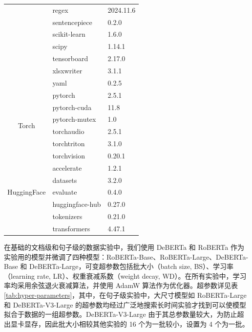 \begin{table}[htbp]
\begin{tabular}{cll}
                             & regex             & 2024.11.6    \\
                             & sentencepiece     & 0.2.0        \\
                             & scikit-learn      & 1.6.0        \\
                             & scipy             & 1.14.1       \\
                             & tensorboard       & 2.17.0       \\
                             & xlsxwriter        & 3.1.1        \\
                             & yaml              & 0.2.5        \\ \midrule
\multirow{6}{*}{Torch}       & pytorch           & 2.5.1        \\
                             & pytorch-cuda      & 11.8         \\
                             & pytorch-mutex     & 1.0          \\
                             & torchaudio        & 2.5.1        \\
                             & torchtriton       & 3.1.0        \\
                             & torchvision       & 0.20.1       \\ \midrule
\multirow{5}{*}{HuggingFace} & accelerate        & 1.2.1        \\
                             & datasets          & 3.2.0        \\
                             & evaluate          & 0.4.0        \\
                             & huggingface-hub   & 0.27.0       \\
                             & tokenizers        & 0.21.0       \\
                             & transformers      & 4.47.1       \\ \bottomrule
\end{tabular}
\end{table}

在基础的文档级和句子级的数据实验中，我们使用 DeBERTa 和 RoBERTa 作为实验用的模型并微调了四种模型：RoBERTa-Base、RoBERTa-Large、DeBERTa-Base 和 DeBERTa-Large，可变超参数包括批大小（batch size, BS）、学习率（learning rate, LR）、权重衰减系数（weight decay, WD）。在所有实验中，学习率均采用余弦退火衰减算法，并使用 AdamW 算法作为优化器。超参数详见表 \ref{tab:hyper-parameters}，其中，在句子级实验中，大尺寸模型如 RoBERTa-Large 和 DeBERTa-V3-Large 的超参数均经过广泛地搜索长时间实验才找到可以使模型拟合于数据的一组超参数。DeBERTa-V3-Large 由于其总参数量较大，为防止超出显卡显存，因此批大小相较其他实验的 16 个为一批较小，设置为 4 个为一批。

